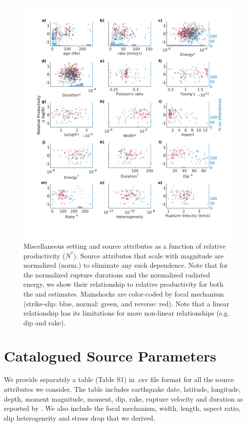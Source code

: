 \documentclass[draft]{agujournal}
\begin{document}
\begin{figure}
\centering
\includegraphics{figures/misc.png}
\caption{Miscellaneous setting and source attributes as a function of relative productivity ($N^*$). Source attributes that scale with magnitude are normalized (norm.) to eliminate any such dependence. Note that for the normalized rupture durations and the normalized radiated energy, we show their relationship to relative productivity for both the \citet{Convers2011GlobalMid2010} and \citet{Hayes2017} estimates. Mainshocks are color-coded by focal mechanism (strike-slip: blue, normal: green, and reverse: red). Note that a linear relationship has its limitations for more non-linear relationships (e.g. dip and rake).}
\label{fig:misc}
\end{figure}   

\section*{Catalogued Source Parameters}

We provide separately a table (Table S1) in .csv file format for all the source attributes we consider. The table includes earthquake date, latitude, longitude, depth, moment magnitude, moment, dip, rake, rupture velocity and duration as reported by \citet{Hayes2017}. We also include the focal mechanism, width, length, aspect ratio, slip heterogeneity and stress drop that we derived.


\end{document}
